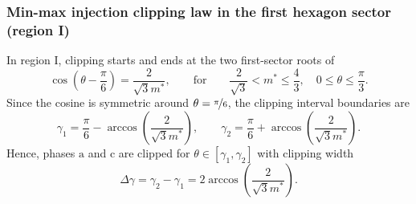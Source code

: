 \begin{frame}
    \frametitle{Min-max injection clipping law in the first hexagon sector (region I)}
    In region I, clipping starts and ends at the two first-sector roots of
    \begin{equation}
        \cos\left(\theta - \frac{\pi}{6}\right) = \frac{2}{\sqrt{3}m^*}, \qquad \text{for} \qquad \frac{2}{\sqrt{3}} < m^* \le \frac{4}{3}, \quad 0 \le \theta \le \frac{\pi}{3}.
    \end{equation}\pause
    Since the cosine is symmetric around $\theta = \nicefrac{\pi}{6}$, the clipping interval boundaries are
    \begin{equation}
        \gamma_1 = \frac{\pi}{6} - \arccos\!\left(\frac{2}{\sqrt{3}m^*}\right),
        \qquad
        \gamma_2 = \frac{\pi}{6} + \arccos\!\left(\frac{2}{\sqrt{3}m^*}\right).
    \end{equation}\pause
    Hence, phases $\mathrm{a}$ and $\mathrm{c}$ are clipped for $\theta \in [\gamma_1,\gamma_2]$ with clipping width
    \begin{equation}
        \Delta\gamma = \gamma_2 - \gamma_1 = 2\arccos\!\left(\frac{2}{\sqrt{3}m^*}\right).
    \end{equation}
\end{frame}

